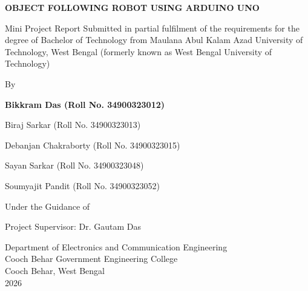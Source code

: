 \documentclass[12pt,a4paper,oneside]{report}
\begin{document}
\begin{titlepage}
\centering
{}
\vspace*{0.3in}
{\fontsize{26}{32}\selectfont\bfseries OBJECT FOLLOWING ROBOT USING ARDUINO UNO\par}
\vspace{0.4in}
{\fontsize{14}{18}\selectfont Mini Project Report Submitted in partial fulfilment of the requirements for the degree of Bachelor of Technology from Maulana Abul Kalam Azad University of Technology, West Bengal (formerly known as West Bengal University of Technology)\par}
\vspace{0.4in}
{\fontsize{14}{18}\selectfont By\par}
\vspace{0.1in}
{\fontsize{13}{17}\selectfont\bfseries
Bikkram Das (Roll No. 34900323012)\par
Biraj Sarkar (Roll No. 34900323013)\par
Debanjan Chakraborty (Roll No. 34900323015)\par
Sayan Sarkar (Roll No. 34900323048)\par
Soumyajit Pandit (Roll No. 34900323052)\par}
\vspace{0.4in}
{\fontsize{14}{18}\selectfont Under the Guidance of\par}
\vspace{0.1in}
{\fontsize{16}{20}\selectfont Project Supervisor: Dr. Gautam Das\par}
\vfill
{\fontsize{14}{18}\selectfont Department of Electronics and Communication Engineering \\ Cooch Behar Government Engineering College \\ Cooch Behar, West Bengal \\ 2026\par}
\vspace*{0.2in}
\end{titlepage}


\newpage
\end{document}
